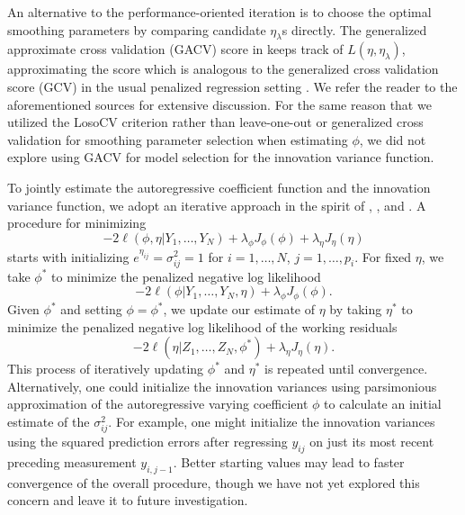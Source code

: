 \bigskip

An alternative to the performance-oriented iteration is to choose the optimal smoothing parameters by comparing candidate $\eta_\lambda$s directly. The generalized approximate cross validation (GACV) score in \cite{xiang1996generalized} keeps track of $L\left( \eta,\eta_\lambda \right)$, approximating the score which is analogous to the generalized cross validation score (GCV) in the usual penalized regression setting \citep{wahba1990spline}. We refer the reader to the aforementioned sources for extensive discussion. For the same reason that we utilized the LosoCV criterion rather than leave-one-out or generalized cross validation for smoothing parameter selection when estimating $\phi$, we did not explore using GACV for model selection for the innovation variance function.

\bigskip

To jointly estimate the autoregressive coefficient function and the innovation variance function, we adopt an iterative approach in the spirit of \cite{huang2006covariance}, \cite{huang2007estimation}, and \cite{pourahmadi2000maximum}. A procedure for minimizing 
\[
-2\ell\left(\phi,\eta \vert Y_1, \dots, Y_N  \right) + \lambda_\phi  J_\phi\left(\phi\right) + \lambda_\eta  J_\eta\left(\eta\right)
\]
starts with initializing $e^{\eta_{ij}} = \sigma^2_{ij} = 1$ for $i = 1,\dots, N$, $j = 1,\dots, p_i$.  For fixed $\eta$, we take $\phi^*$ to minimize the penalized negative log likelihood 
\[
-2\ell\left(\phi\vert Y_1, \dots, Y_N, \eta\right) + \lambda_\phi  J_\phi\left(\phi\right).
\]
\noindent
Given $\phi^*$ and setting $\phi = \phi^*$, we update our estimate of $\eta$ by taking $\eta^*$ to minimize the penalized negative log likelihood of the working residuals  
\[
-2\ell\left( \eta \vert Z_1,\dots, Z_N, \phi^* \right) + \lambda_\eta  J_\eta\left(\eta\right).
\]
This process of iteratively updating $\phi^*$ and ${\eta}^*$ is repeated until convergence. Alternatively, one could initialize the innovation variances using parsimonious approximation of the autoregressive varying coefficient $\phi$ to calculate an initial estimate of the $\sigma_{ij}^2$. For example, one might initialize the innovation variances using the squared prediction errors after regressing $y_{ij}$ on just its most recent preceding measurement $y_{i,j-1}$. Better starting values may lead to faster convergence of the overall procedure, though we have not yet explored this concern and leave it to future investigation.



